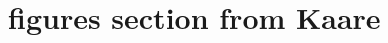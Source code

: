 \documentclass[twocolumn,amsmath,amssymb,floatfix]{article}
\begin{document}
\section{figures section from Kaare}
\end{document}
